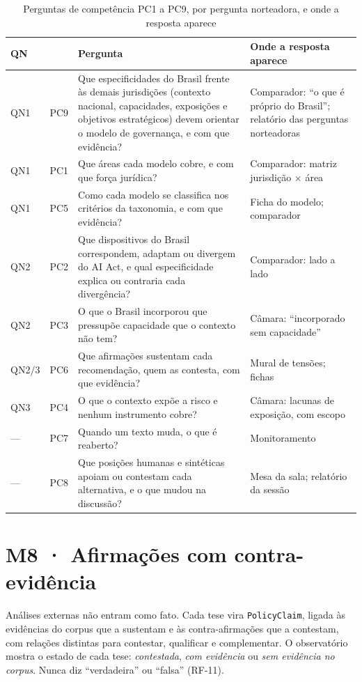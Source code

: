\documentclass[12pt,a4paper,oneside,english,brazil]{abntex2}
\newcommand{\rf}[1]{{\footnotesize(#1)}}
\begin{document}
\begin{table}[htb]
\caption{Perguntas de competência PC1 a PC9, por pergunta norteadora, e onde a resposta aparece}\label{tab:pc}
\small
\begin{tabularx}{\linewidth}{l l L L}
\toprule
QN & & Pergunta & Onde a resposta aparece\\
\midrule
QN1 & PC9 & Que especificidades do Brasil frente às demais jurisdições (contexto nacional, capacidades, exposições e objetivos estratégicos) devem orientar o modelo de governança, e com que evidência? & Comparador: ``o que é próprio do Brasil''; relatório das perguntas norteadoras\\
QN1 & PC1 & Que áreas cada modelo cobre, e com que força jurídica? & Comparador: matriz jurisdição $\times$ área\\
QN1 & PC5 & Como cada modelo se classifica nos critérios da taxonomia, e com que evidência? & Ficha do modelo; comparador\\
\midrule
QN2 & PC2 & Que dispositivos do Brasil correspondem, adaptam ou divergem do AI Act, e qual especificidade explica ou contraria cada divergência? & Comparador: lado a lado\\
QN2 & PC3 & O que o Brasil incorporou que pressupõe capacidade que o contexto não tem? & Câmara: ``incorporado sem capacidade''\\
QN2/3 & PC6 & Que afirmações sustentam cada recomendação, quem as contesta, com que evidência? & Mural de tensões; fichas\\
\midrule
QN3 & PC4 & O que o contexto expõe a risco e nenhum instrumento cobre? & Câmara: lacunas de exposição, com escopo\\
\midrule
— & PC7 & Quando um texto muda, o que é reaberto? & Monitoramento\\
— & PC8 & Que posições humanas e sintéticas apoiam ou contestam cada alternativa, e o que mudou na discussão? & Mesa da sala; relatório da sessão\\
\bottomrule
\end{tabularx}
\end{table}

\section{M8 · Afirmações com contra-evidência}\label{sec:afirmacoes}
Análises externas não entram como fato. Cada tese vira \texttt{PolicyClaim}, ligada às evidências do corpus que a sustentam e às contra-afirmações que a contestam, com relações distintas para contestar, qualificar e complementar. O observatório mostra o estado de cada tese: \emph{contestada}, \emph{com evidência} ou \emph{sem evidência no corpus}. Nunca diz ``verdadeira'' ou ``falsa'' \rf{RF-11}.
\end{document}
